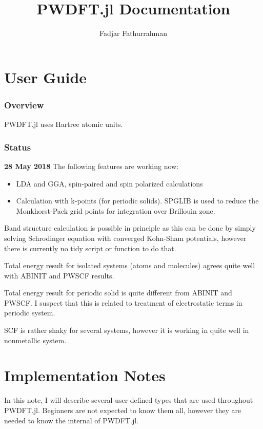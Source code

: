 \documentclass[a4paper,10pt]{paper}
\begin{document}
\title{\textsf{PWDFT.jl} Documentation}
\author{Fadjar Fathurrahman}
\maketitle

\tableofcontents

\part{User Guide}

\section{Overview}

\textsf{PWDFT.jl} uses Hartree atomic units.

\section{Status}

\textbf{28 May 2018} The following features are working now:
\begin{itemize}
\item LDA and GGA, spin-paired and spin polarized calculations
\item Calculation with k-points (for periodic solids).
  \textsf{SPGLIB} is used to reduce the Monkhorst-Pack grid points
  for integration over Brillouin zone.
\end{itemize}

Band structure calculation is possible in principle as this can be
done by simply solving
Schrodinger equation with converged Kohn-Sham potentials, however there
is currently no tidy script or function to do that.

Total energy result for isolated systems (atoms and molecules) agrees quite
well with ABINIT and PWSCF results.

Total energy result for periodic solid is quite different from ABINIT and PWSCF.
I suspect that this is related to treatment of electrostatic terms in periodic system.

SCF is rather shaky for several systems, however it is working in quite well in nonmetallic
system.

\part{Implementation Notes}

In this note, I will describe several user-defined types that are
used throughout \textsf{PWDFT.jl}. Beginners are not expected to know them
all, however they are needed to know the internal of \textsf{PWDFT.jl}.
\end{document}
